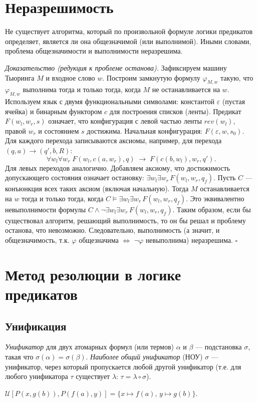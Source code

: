 \documentclass[10pt]{article}
\begin{document}
\section{Неразрешимость}
\begin{theorem}
Не существует алгоритма, который по произвольной формуле логики предикатов определяет, является ли она общезначимой (или выполнимой). Иными словами, проблема общезначимости и выполнимости неразрешима.
\end{theorem}
\textit{Доказательство (редукция к проблеме останова).} Зафиксируем машину Тьюринга $M$ и входное слово $w$. Построим замкнутую формулу $\varphi_{M,w}$ такую, что $\varphi_{M,w}$ выполнима тогда и только тогда, когда $M$ не останавливается на $w$. Используем язык с двумя функциональными символами: константой $\varepsilon$ (пустая ячейка) и бинарным функтором $c$ для построения списков (ленты). Предикат $F(w_l,w_r,s)$ означает, что конфигурация с левой частью ленты $rev(w_l)$, правой $w_r$ и состоянием $s$ достижима. Начальная конфигурация: $F(\varepsilon,w,s_0)$. Для каждого перехода записываются аксиомы, например, для перехода $(q,a)\to(q',b,R)$:
\[
\forall w_l\forall w_r\;F(w_l,c(a,w_r),q)\;\to\;F(c(b,w_l),w_r,q').
\]
Для левых переходов аналогично. Добавляем аксиому, что достижимость допускающего состояния означает остановку: $\exists w_l\exists w_r\,F(w_l,w_r,q_f)$. Пусть $C$ — конъюнкция всех таких аксиом (включая начальную). Тогда $M$ останавливается на $w$ тогда и только тогда, когда $C\models\exists w_l\exists w_r\,F(w_l,w_r,q_f)$. Это эквивалентно невыполнимости формулы $C\wedge\neg\exists w_l\exists w_r\,F(w_l,w_r,q_f)$. Таким образом, если бы существовал алгоритм, решающий выполнимость, то он бы решал и проблему останова, что невозможно. Следовательно, выполнимость (а значит, и общезначимость, т.к. $\varphi$ общезначима $\iff$ $\neg\varphi$ невыполнима) неразрешима. \hfill $\square$

\section{Метод резолюции в логике предикатов}
\subsection{Унификация}
\textit{Унификатор} для двух атомарных формул (или термов) $\alpha$ и $\beta$ — подстановка $\sigma$, такая что $\sigma(\alpha)=\sigma(\beta)$. \textit{Наиболее общий унификатор} (НОУ) $\sigma$ — унификатор, через который пропускается любой другой унификатор (т.е. для любого унификатора $\tau$ существует $\lambda$: $\tau=\lambda\circ\sigma$).
\begin{example}
$\mathcal{U}[P(x,g(b)), P(f(a),y)] = \{x\mapsto f(a),\, y\mapsto g(b)\}$.
\end{example}
\end{document}
